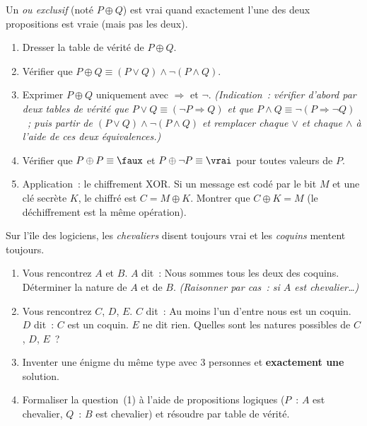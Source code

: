 \begin{challenge}
Un \emph{ou exclusif} (not\'e $P \oplus Q$) est vrai quand exactement
l'une des deux propositions est vraie (mais pas les deux).
\begin{enumerate}
  \item Dresser la table de v\'erit\'e de $P \oplus Q$.
  \item V\'erifier que $P \oplus Q \equiv (P \lor Q) \land \lnot(P \land Q)$.
  \item Exprimer $P \oplus Q$ uniquement avec $\Rightarrow$ et $\lnot$.
        \emph{(Indication~: v\'erifier d'abord par deux tables de v\'erit\'e que
        $P\lor Q\equiv(\lnot P\Rightarrow Q)$ et que
        $P\land Q\equiv\lnot(P\Rightarrow\lnot Q)$~;
        puis partir de $(P\lor Q)\land\lnot(P\land Q)$ et remplacer
        chaque $\lor$ et chaque $\land$ \`a l'aide de ces deux \'equivalences.)}
  \item V\'erifier que $P \oplus P \equiv \faux$ et $P \oplus \lnot P \equiv \vrai$
        pour toutes valeurs de $P$.
  \item Application~: le chiffrement XOR. Si un message est cod\'e
        par le bit $M$ et une cl\'e secrète $K$, le chiffr\'e est $C = M \oplus K$.
        Montrer que $C \oplus K = M$ (le d\'echiffrement est la m\^eme op\'eration).
\end{enumerate}
\end{challenge}

\begin{challenge}
Sur l'\^ile des logiciens, les \emph{chevaliers} disent toujours vrai
et les \emph{coquins} mentent toujours.
\begin{enumerate}
  \item Vous rencontrez $A$ et $B$.
        $A$ dit~: \og Nous sommes tous les deux des coquins.\fg
        D\'eterminer la nature de $A$ et de $B$.
        \emph{(Raisonner par cas~: si $A$ est chevalier\ldots)}
  \item Vous rencontrez $C$, $D$, $E$.
        $C$ dit~: \og Au moins l'un d'entre nous est un coquin.\fg
        $D$ dit~: \og$C$ est un coquin.\fg
        $E$ ne dit rien.
        Quelles sont les natures possibles de $C$, $D$, $E$~?
  \item Inventer une \'enigme du m\^eme type avec $3$ personnes
        et \textbf{exactement une} solution.
  \item Formaliser la question~(1) \`a l'aide de propositions logiques
        ($P$~: \og$A$ est chevalier\fg, $Q$~: \og$B$ est chevalier\fg)
        et r\'esoudre par table de v\'erit\'e.
\end{enumerate}
\end{challenge}

